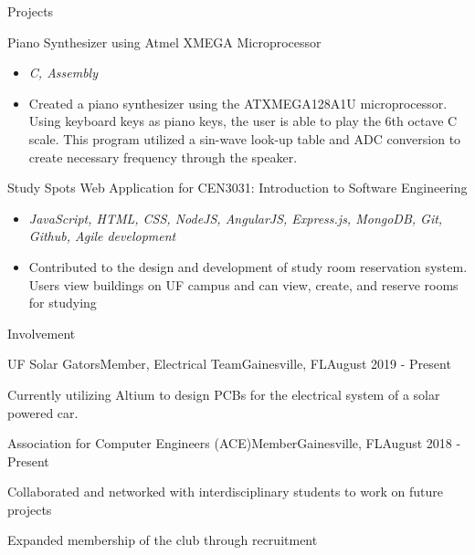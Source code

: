 \documentclass{article}
\newlength{\tabin}
\newlength{\secsep}
\newcommand{\lineunder}{\vspace*{-8pt} \\ \hspace*{-6pt} \hrulefill \\ \vspace*{-15pt}}
\newenvironment{tabbedsection}[1]{
  \begin{list}{}{
      \setlength{\itemsep}{0pt}
      \setlength{\labelsep}{0pt}
      \setlength{\labelwidth}{0pt}
      \setlength{\leftmargin}{\tabin}
      \setlength{\rightmargin}{\tabin}
      \setlength{\listparindent}{0pt}
      \setlength{\parsep}{0pt}
      \setlength{\parskip}{1pt}
      \setlength{\partopsep}{0pt}
      \setlength{\topsep}{#1}
    }
  \item[]
}{\end{list}}
\newenvironment{resume_section}[1]{ 
  \filbreak
  \vspace{2\secsep}
  \MakeUppercase{ \large#1}
  \lineunder
  \begin{tabbedsection}{\secsep}
}{\end{tabbedsection}}
\newenvironment{resume_subsection}[2][]{
  \textbf{#2} \hfill {\footnotesize #1} \hspace{2em}
  \begin{tabbedsection}{0.5\secsep}
}{\end{tabbedsection}}
\newenvironment{subitems}{
  \renewcommand{\labelitemi}{-}
  \begin{itemize}
      \setlength{\labelsep}{1em}
}{\end{itemize}}
\newenvironment{resume_employer}[4]{
  \vspace{\secsep}
  \textbf{#1} \\ 
  \indent {\small #2} \hfill {\footnotesize#3 (#4)}
  \begin{tabbedsection}{0pt}
  \begin{subitems}
}{\end{subitems}\end{tabbedsection}}
\begin{document}
\begin{resume_section}{Projects}
  \begin{resume_subsection}[]{Piano Synthesizer using Atmel XMEGA Microprocessor}
  \begin{subitems}
    \item \textit{C, Assembly}
    \item Created a  piano synthesizer using the ATXMEGA128A1U microprocessor. Using keyboard keys as piano keys, the user is able to play the 6th octave C scale. This program utilized a sin-wave look-up table and ADC conversion to create necessary frequency through the speaker.
    \end{subitems}
  \end{resume_subsection}
  
   \begin{resume_subsection}[]{Study Spots Web Application for CEN3031: Introduction to Software Engineering}
  \begin{subitems}
    \item \textit{JavaScript, HTML, CSS, NodeJS, AngularJS, Express.js, MongoDB, Git, Github, Agile development}
    \item Contributed to the design and development of study room reservation system. Users view buildings on UF campus and can view, create, and reserve rooms for studying
    \end{subitems}
  \end{resume_subsection}
\end{resume_section}



\begin{resume_section}{Involvement}
  \begin{resume_employer}{UF Solar Gators}{Member, Electrical Team}{Gainesville, FL}{August 2019 - Present}
    \item Currently utilizing Altium to design PCBs for the electrical system of a solar powered car.
  \end{resume_employer}
  
  \begin{resume_employer}{Association for Computer Engineers (ACE)}{Member}{Gainesville, FL}{August 2018 - Present}
    \item Collaborated and networked with interdisciplinary students to work on future projects
    \item Expanded membership of the club through recruitment
  \end{resume_employer}
\end{resume_section}
\end{document}
